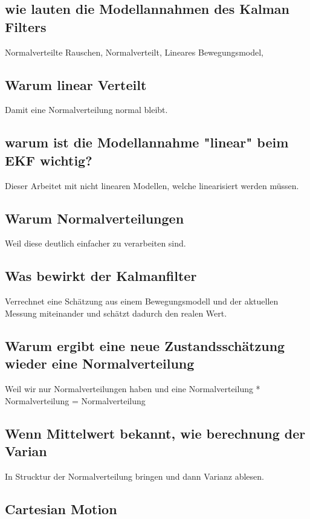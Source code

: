 \subsection{wie lauten die Modellannahmen des Kalman Filters}
Normalverteilte Rauschen, Normalverteilt, Lineares Bewegungsmodel,
\subsection{Warum linear Verteilt}
Damit eine Normalverteilung normal bleibt. 

\subsection{warum ist die Modellannahme "linear" beim EKF wichtig?}

Dieser Arbeitet mit nicht linearen Modellen, welche linearisiert werden müssen.

\subsection{Warum Normalverteilungen}
Weil diese deutlich einfacher zu verarbeiten sind.  

\subsection{Was bewirkt der Kalmanfilter}
Verrechnet eine Schätzung aus einem Bewegungsmodell und der aktuellen Messung miteinander und schätzt dadurch den realen Wert.

\subsection{Warum ergibt eine neue Zustandsschätzung wieder eine Normalverteilung}

Weil wir nur Normalverteilungen haben und eine Normalverteilung * Normalverteilung = Normalverteilung
\subsection{Wenn Mittelwert bekannt, wie berechnung der Varian}
In Strucktur der Normalverteilung bringen und dann Varianz ablesen.
\subsection{Cartesian Motion}





